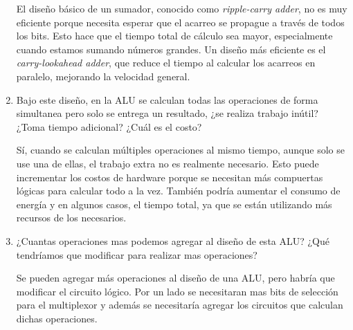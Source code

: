 \documentclass{article}
\begin{document}
\begin{enumerate}
    El diseño básico de un sumador, conocido como \textit{ripple-carry adder}, no es muy eficiente porque necesita esperar que el acarreo se propague a través de todos los bits. Esto hace que el tiempo total de cálculo sea mayor, especialmente cuando estamos sumando números grandes. Un diseño más eficiente es el \textit{carry-lookahead adder}, que reduce el tiempo al calcular los acarreos en paralelo, mejorando la velocidad general.




\item Bajo este diseño, en la ALU se calculan todas las operaciones de forma simultanea pero solo se entrega un resultado, ¿se realiza trabajo inútil?
¿Toma tiempo adicional? ¿Cuál es el costo?

    Sí, cuando se calculan múltiples operaciones al mismo tiempo, aunque solo se use una de ellas, el trabajo extra no es realmente necesario. Esto puede incrementar los costos de hardware porque se necesitan más compuertas lógicas para calcular todo a la vez. También podría aumentar el consumo de energía y en algunos casos, el tiempo total, ya que se están utilizando más recursos de los necesarios.




\item ¿Cuantas operaciones mas podemos agregar al diseño de esta ALU? ¿Qué tendríamos que modificar para realizar mas operaciones?

 Se pueden agregar más operaciones al diseño de una ALU, pero habría que modificar el circuito lógico. Por un lado se necesitaran mas bits de selección para el multiplexor y además se necesitaría agregar los circuitos que calculan dichas operaciones.
 

\end{enumerate}
\end{document}
